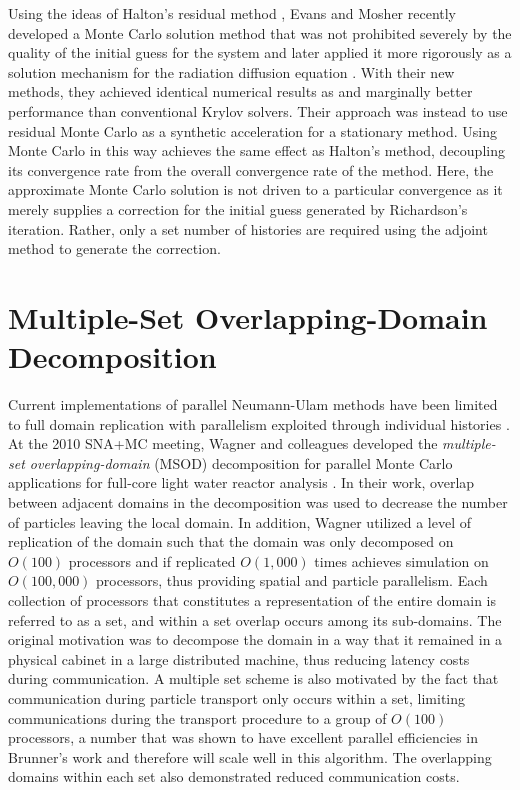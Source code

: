 \documentclass{snamc2013}
\begin{document}
Using the ideas of Halton's residual method
\cite{halton_sequential_1994}, Evans and Mosher recently developed a
Monte Carlo solution method that was not prohibited severely by the
quality of the initial guess for the system \cite{evans_monte_2009}
and later applied it more rigorously as a solution mechanism for the
radiation diffusion equation \cite{evans_monte_2012}. With their new
methods, they achieved identical numerical results as and marginally
better performance than conventional Krylov solvers. Their approach
was instead to use residual Monte Carlo as a synthetic acceleration
for a stationary method. Using Monte Carlo in this way achieves the
same effect as Halton's method, decoupling its convergence rate from
the overall convergence rate of the method. Here, the approximate
Monte Carlo solution is not driven to a particular convergence as it
merely supplies a correction for the initial guess generated by
Richardson's iteration. Rather, only a set number of histories are
required using the adjoint method to generate the correction.

\section{Multiple-Set Overlapping-Domain Decomposition}

Current implementations of parallel Neumann-Ulam methods have been
limited to full domain replication with parallelism exploited through
individual histories \cite{alexandrov_efficient_1998}. At the 2010
SNA+MC meeting, Wagner and colleagues developed the
\textit{multiple-set overlapping-domain} (MSOD) decomposition for
parallel Monte Carlo applications for full-core light water reactor
analysis \cite{wagner_hybrid_2010}. In their work, overlap between
adjacent domains in the decomposition was used to decrease the number
of particles leaving the local domain. In addition, Wagner utilized a
level of replication of the domain such that the domain was only
decomposed on $O(100)$ processors and if replicated $O(1,000)$ times
achieves simulation on $O(100,000)$ processors, thus providing spatial
and particle parallelism. Each collection of processors that
constitutes a representation of the entire domain is referred to as a
set, and within a set overlap occurs among its sub-domains. The
original motivation was to decompose the domain in a way that it
remained in a physical cabinet in a large distributed machine, thus
reducing latency costs during communication. A multiple set scheme is
also motivated by the fact that communication during particle
transport only occurs within a set, limiting communications during the
transport procedure to a group of $O(100)$ processors, a number that
was shown to have excellent parallel efficiencies in Brunner's work
\cite{brunner_efficient_2009} and therefore will scale well in this
algorithm. The overlapping domains within each set also demonstrated
reduced communication costs.
\end{document}

